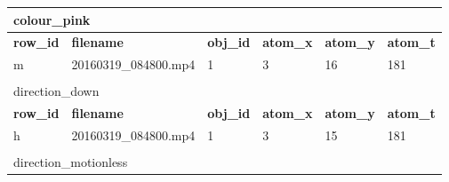 \begin{table}[tb!]
\begin{tabular}{llllll}
  \multicolumn{6}{l}{{ colour\_pink}}                                                                                                                                                                                                              \\ \hline
  \multicolumn{1}{|l|}{\textbf{row\_id}} & \multicolumn{1}{l|}{\textbf{filename}}    & \multicolumn{1}{l|}{\textbf{obj\_id}} & \multicolumn{1}{l|}{\textbf{atom\_x}} & \multicolumn{1}{l|}{\textbf{atom\_y}} & \multicolumn{1}{l|}{\textbf{atom\_t}} \\ \hline
  \multicolumn{1}{|l|}{m}                & \multicolumn{1}{l|}{20160319\_084800.mp4} & \multicolumn{1}{l|}{1}                & \multicolumn{1}{l|}{3}                & \multicolumn{1}{l|}{16}               & \multicolumn{1}{l|}{181}              \\ \hline
                                         &                                           &                                       &                                       &                                       &                                       \\
  \multicolumn{6}{l}{{ direction\_down}}                                                                                                                                                                                                          \\ \hline
  \multicolumn{1}{|l|}{\textbf{row\_id}} & \multicolumn{1}{l|}{\textbf{filename}}    & \multicolumn{1}{l|}{\textbf{obj\_id}} & \multicolumn{1}{l|}{\textbf{atom\_x}} & \multicolumn{1}{l|}{\textbf{atom\_y}} & \multicolumn{1}{l|}{\textbf{atom\_t}} \\ \hline
  \multicolumn{1}{|l|}{h}                & \multicolumn{1}{l|}{20160319\_084800.mp4} & \multicolumn{1}{l|}{1}                & \multicolumn{1}{l|}{3}                & \multicolumn{1}{l|}{15}               & \multicolumn{1}{l|}{181}              \\ \hline
                                         &                                           &                                       &                                       &                                       &                                       \\
  \multicolumn{6}{l}{{ direction\_motionless}}                                                                                                                                                                                                    \\ \hline

\end{tabular}
\end{table}
